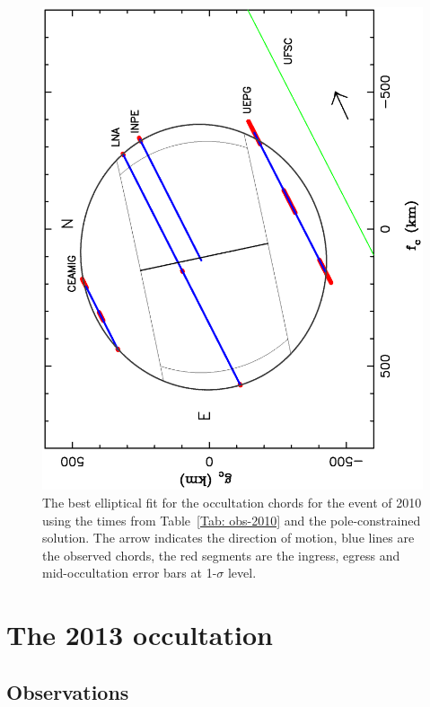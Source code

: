 \documentclass[useAMS,usenatbib]{mn2e}
\begin{document}
\begin{figure}
\includegraphics[scale=0.37, angle=-90]{figures/Ceres_2010_sphere.eps} 
\caption{The best elliptical fit for the occultation chords for the event of 2010 using the times from Table~\ref{Tab: obs-2010} and the pole-constrained solution. The arrow indicates the direction of motion, blue lines are the observed chords, the red segments are the ingress, egress and mid-occultation error bars at 1-$\sigma$ level. \label{Fig:Ceres-2010-body}}
\end{figure}







\section{The 2013 occultation}

\subsection{Observations}\label{Sec: observation-2013}
\end{document}
